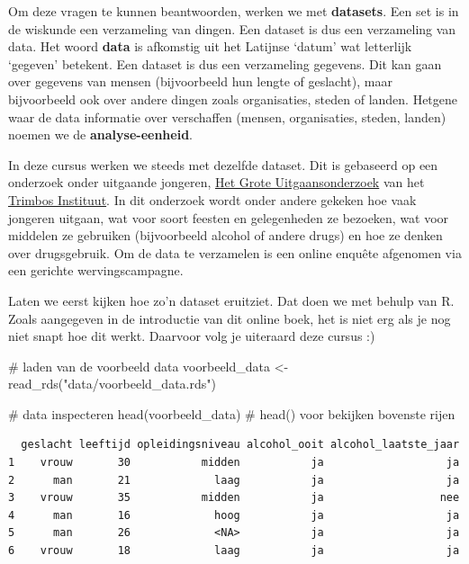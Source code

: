 \documentclass[
  letterpaper,
  DIV=11,
  numbers=noendperiod]{scrreprt}
\newenvironment{Shaded}{\begin{snugshade}}{\end{snugshade}}
\newcommand{\CommentTok}[1]{\textcolor[rgb]{0.37,0.37,0.37}{#1}}
\newcommand{\FunctionTok}[1]{\textcolor[rgb]{0.28,0.35,0.67}{#1}}
\newcommand{\NormalTok}[1]{\textcolor[rgb]{0.00,0.23,0.31}{#1}}
\newcommand{\OtherTok}[1]{\textcolor[rgb]{0.00,0.23,0.31}{#1}}
\newcommand{\StringTok}[1]{\textcolor[rgb]{0.13,0.47,0.30}{#1}}
\begin{document}
Om deze vragen te kunnen beantwoorden, werken we met \textbf{datasets}.
Een set is in de wiskunde een verzameling van dingen. Een dataset is dus
een verzameling van data. Het woord \textbf{data} is afkomstig uit het
Latijnse `datum' wat letterlijk `gegeven' betekent. Een dataset is dus
een verzameling gegevens. Dit kan gaan over gegevens van mensen
(bijvoorbeeld hun lengte of geslacht), maar bijvoorbeeld ook over andere
dingen zoals organisaties, steden of landen. Hetgene waar de data
informatie over verschaffen (mensen, organisaties, steden, landen)
noemen we de \textbf{analyse-eenheid}.

In deze cursus werken we steeds met dezelfde dataset. Dit is gebaseerd
op een onderzoek onder uitgaande jongeren,
\href{https://www.trimbos.nl/kennisbank/rapport-het-grote-uitgaansonderzoek-2023/}{Het
Grote Uitgaansonderzoek} van het \href{https://www.trimbos.nl/}{Trimbos
Instituut}. In dit onderzoek wordt onder andere gekeken hoe vaak
jongeren uitgaan, wat voor soort feesten en gelegenheden ze bezoeken,
wat voor middelen ze gebruiken (bijvoorbeeld alcohol of andere drugs) en
hoe ze denken over drugsgebruik. Om de data te verzamelen is een online
enquête afgenomen via een gerichte wervingscampagne.

Laten we eerst kijken hoe zo'n dataset eruitziet. Dat doen we met behulp
van R. Zoals aangegeven in de introductie van dit online boek, het is
niet erg als je nog niet snapt hoe dit werkt. Daarvoor volg je uiteraard
deze cursus :)

\begin{Shaded}
\begin{Highlighting}[]
\CommentTok{\# laden van de voorbeeld data}
\NormalTok{voorbeeld\_data }\OtherTok{\textless{}{-}} \FunctionTok{read\_rds}\NormalTok{(}\StringTok{"data/voorbeeld\_data.rds"}\NormalTok{)}

\CommentTok{\# data inspecteren}
\FunctionTok{head}\NormalTok{(voorbeeld\_data) }\CommentTok{\# head() voor bekijken bovenste rijen}
\end{Highlighting}
\end{Shaded}

\begin{verbatim}
  geslacht leeftijd opleidingsniveau alcohol_ooit alcohol_laatste_jaar
1    vrouw       30           midden           ja                   ja
2      man       21             laag           ja                   ja
3    vrouw       35           midden           ja                  nee
4      man       16             hoog           ja                   ja
5      man       26             <NA>           ja                   ja
6    vrouw       18             laag           ja                   ja
\end{verbatim}
\end{document}
